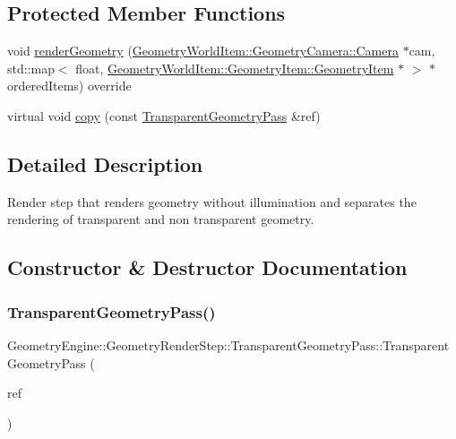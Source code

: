 \subsection*{Protected Member Functions}
\begin{DoxyCompactItemize}
\item 
void \mbox{\hyperlink{class_geometry_engine_1_1_geometry_render_step_1_1_transparent_geometry_pass_a05b2c129cdefb4d5b4d140b683f63f99}{render\+Geometry}} (\mbox{\hyperlink{class_geometry_engine_1_1_geometry_world_item_1_1_geometry_camera_1_1_camera}{Geometry\+World\+Item\+::\+Geometry\+Camera\+::\+Camera}} $\ast$cam, std\+::map$<$ float, \mbox{\hyperlink{class_geometry_engine_1_1_geometry_world_item_1_1_geometry_item_1_1_geometry_item}{Geometry\+World\+Item\+::\+Geometry\+Item\+::\+Geometry\+Item}} $\ast$ $>$ $\ast$ordered\+Items) override
\item 
virtual void \mbox{\hyperlink{class_geometry_engine_1_1_geometry_render_step_1_1_transparent_geometry_pass_a4f8821d67b06746fa1c1aba1f70e1b83}{copy}} (const \mbox{\hyperlink{class_geometry_engine_1_1_geometry_render_step_1_1_transparent_geometry_pass}{Transparent\+Geometry\+Pass}} \&ref)
\end{DoxyCompactItemize}


\subsection{Detailed Description}
Render step that renders geometry without illumination and separates the rendering of transparent and non transparent geometry. 

\subsection{Constructor \& Destructor Documentation}
\mbox{\label{class_geometry_engine_1_1_geometry_render_step_1_1_transparent_geometry_pass_a345a08ae0ee85a990f56f8e943a4e22d}} 
\subsubsection{\texorpdfstring{TransparentGeometryPass()}{TransparentGeometryPass()}}
{\footnotesize\ttfamily Geometry\+Engine\+::\+Geometry\+Render\+Step\+::\+Transparent\+Geometry\+Pass\+::\+Transparent\+Geometry\+Pass (\begin{DoxyParamCaption}\item[{const \mbox{\hyperlink{class_geometry_engine_1_1_geometry_render_step_1_1_transparent_geometry_pass}{Transparent\+Geometry\+Pass}} \&}]{ref }\end{DoxyParamCaption})\hspace{0.3cm}{\ttfamily [inline]}}

